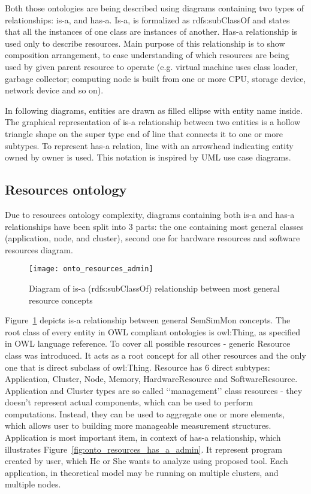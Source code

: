 Both those ontologies are being described using diagrams containing two types of relationships: is-a, and has-a. Is-a, is formalized as rdfs:subClassOf and states that all the instances of one class are instances of another\cite{rdfRef:2004}. Has-a relationship is used only to describe resources. Main purpose of this relationship is to show composition arrangement, to ease understanding of which resources are being used by given parent resource to operate (e.g. virtual machine uses class loader, garbage collector; computing node is built from one or more CPU, storage device, network device and so on).

In following diagrams, entities are drawn as filled ellipse with entity name inside. The graphical representation of is-a relationship between two entities is a hollow triangle shape on the super type end of line that connects it to one or more subtypes. To represent has-a relation, line with an arrowhead indicating entity owned by owner is used. This notation is inspired by UML use case diagrams.

\pagebreak

\subsection{Resources ontology}
\label{subsec:arch_knowledge_resources}

Due to resources ontology complexity, diagrams containing both is-a and has-a relationships have been split into 3 parts: the one containing most general classes (application, node, and cluster), second one for hardware resources and software resources diagram.

\begin{figure}[ht]
\centering
\texttt{[image: onto\_resources\_admin]}
\caption{Diagram of is-a (rdfs:subClassOf) relationship between most general resource concepts}
\label{fig:onto_resources_admin}
\end{figure}

Figure~\ref{fig:onto_resources_admin} depicts is-a relationship between general SemSimMon concepts. The root class of every entity in OWL compliant ontologies is owl:Thing, as specified in OWL language reference\cite{owlRef:2004}. To cover all possible resources - generic Resource class was introduced. It acts as a root concept for all other resources and the only one that is direct subclass of owl:Thing. Resource has 6 direct subtypes: Application, Cluster, Node, Memory, HardwareResource and SoftwareResource. Application and Cluster types are so called \lq\lq{}management\rq\rq{} class resources - they doesn't represent actual components, which can be used to perform computations. Instead, they can be used to aggregate one or more elements, which allows user to building more manageable measurement structures. Application is most important item, in context of has-a relationship, which illustrates Figure~\ref{fig:onto_resources_has_a_admin}. It represent program created by user, which He or She wants to analyze using proposed tool. Each application, in theoretical model may be running on multiple clusters, and multiple nodes.

